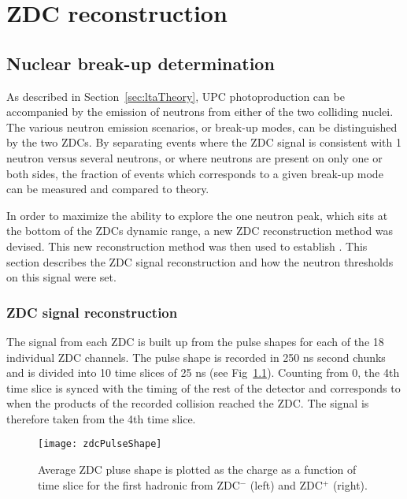 \chapter{\label{ch:zdcReco}ZDC reconstruction}
  \section{\label{sec:breakUpDet} Nuclear break-up determination}
    As described in Section~\ref{sec:ltaTheory}, UPC \JPsi{} photoproduction 
      can be accompanied by the emission of neutrons from either of the two 
      colliding nuclei.
    The various neutron emission scenarios, or break-up modes, can 
      be distinguished by the two ZDCs.
    By separating events where the ZDC signal is consistent with 1 neutron 
      versus several neutrons, or where neutrons are present on only one or 
      both sides, the fraction of events which corresponds to a given 
      break-up mode can be measured and compared to theory. 

    In order to maximize the ability to explore the one neutron peak, which 
      sits at the bottom of the ZDCs dynamic range, a new ZDC reconstruction 
      method was devised. 
    This new reconstruction method was then used to establish 
      \DIFdelbegin {}\DIFdelend \DIFaddbegin {}\DIFaddend . 
    This section describes the ZDC signal reconstruction and how the neutron 
      thresholds on this signal were set.

    \subsection{ZDC signal reconstruction}
      The signal from each ZDC is built up from the pulse shapes for each of 
        the 18 individual ZDC channels. 
      The pulse shape is recorded in 250 ns second chunks and is divided into
        10 time slices of 25 ns (see Fig~\ref{fig:zdcPulseShape}).
      Counting from 0, the 4th time slice is synced with the timing of the rest
        of the detector and corresponds to when the products of the recorded 
        collision reached the ZDC.
      The \DIFdelbegin {}\DIFdelend signal is therefore taken from the 4th time slice.
      \begin{figure}[h]
        \centering
        \texttt{[image: zdcPulseShape]}
        \caption{Average ZDC pluse shape is plotted as the charge as a function
          of time slice for the first hadronic from ZDC$^{-}$ (left) and 
          ZDC$^{+}$ (right).}
        \label{fig:zdcPulseShape}
      \end{figure}

